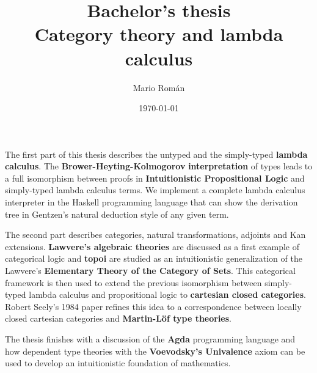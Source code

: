 \documentclass[11pt]{article}
\author{Mario Román}
\date{\today}
\title{Bachelor's thesis\\\medskip
\large Category theory and lambda calculus}
\begin{document}
\maketitle
The first part of this thesis describes the untyped and the
simply-typed \textbf{lambda calculus}. The \textbf{Brower-Heyting-Kolmogorov}
\textbf{interpretation} of types leads to a full isomorphism between proofs in
\textbf{Intuitionistic Propositional Logic} and simply-typed lambda calculus
terms. We implement a complete lambda calculus interpreter in the
Haskell programming language that can show the derivation tree in
Gentzen's natural deduction style of any given term.

\quad

The second part describes categories, natural transformations,
adjoints and Kan extensions. \textbf{Lawvere's algebraic theories} are
discussed as a first example of categorical logic and \textbf{topoi} are
studied as an intuitionistic generalization of the Lawvere's
\textbf{Elementary Theory of the Category of Sets}.
This categorical framework is then used to extend the previous
isomorphism between simply-typed lambda calculus and propositional
logic to \textbf{cartesian closed categories}. Robert Seely's 1984 paper
refines this idea to a correspondence between locally closed cartesian
categories and \textbf{Martin-Löf type theories}.

\quad

The thesis finishes with a discussion of the \textbf{Agda} programming language
and how dependent type theories with the \textbf{Voevodsky's Univalence} axiom
can be used to develop an intuitionistic foundation of mathematics.
\end{document}
